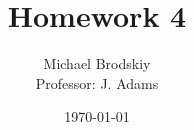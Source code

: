 


\title{Homework 4}
\date{\today}
\author{Michael Brodskiy\\ \small Professor: J. Adams}



\maketitle

